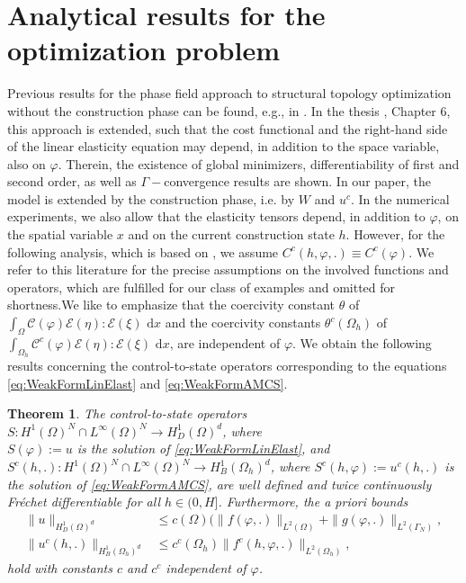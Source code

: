 \documentclass[a4paper,11pt]{article}
\newtheorem{theorem}{Theorem}%
\theoremstyle{remark}
\newcommand{\dx}{\text{ d}x}
\newcommand{\HON}{H^1(\Omega)^N }
\newcommand{\LinfN}{L^\infty(\Omega)^N}
\begin{document}
\newpage
\section{Analytical results for the optimization problem}
\label{sec:AnalysisOCP}
Previous results for the phase field approach to structural topology optimization without the construction phase can be found, e.g., in \cite{BFGS14,VMPT,BurgerStainko,Dede2012,PRW12}. 
In the thesis \cite{DissRupprecht}, Chapter 6, this approach is extended, such that the cost functional and the right-hand side of the linear elasticity equation may depend, in addition to the space variable, also on $\varphi$.
Therein, the existence of global minimizers, differentiability of first and second order, as well as $\Gamma-$convergence results are shown.
%
In our paper, the model is extended by the construction phase, i.e. by $W$ and $u^c$.
In the numerical experiments, we also allow that the elasticity tensors depend, in addition to $\varphi$, on the spatial variable $x$ and on the current construction state $h$.
However, for the following analysis, which is based on \cite{DissRupprecht}, we assume
$C^c(h,\varphi,.)\equiv C^c(\varphi)$.
We refer to this literature for the precise assumptions on the involved functions and operators, which are fulfilled for our class of examples and omitted for shortness.We like to emphasize that
the coercivity constant $\theta $
of
 $\int_{\Omega}\mathcal{C}(\varphi)
 \mathcal{E}(\eta):\mathcal{E}(\xi) \dx$
 and the  coercivity constants
 $\theta^c(\Omega_h)$
of $\int_{\Omega_{h}}\mathcal{C}^c(\varphi)
 \mathcal{E}(\eta):\mathcal{E}(\xi) \dx$,
 are independent of 
 $\varphi$.
We obtain the following results concerning the control-to-state operators corresponding to the equations \eqref{eq:WeakFormLinElast} and \eqref{eq:WeakFormAMCS}.
\begin{theorem}
The control-to-state operators
 $S:\HON \cap \LinfN \rightarrow H^1_D(\Omega)^d $,
 where \\ 
 $S(\varphi):=u$ is the solution of \eqref{eq:WeakFormLinElast},
 and
 $S^c(h,.):\HON \cap \LinfN \rightarrow  H^1_B(\Omega_{h})^d$,
 where $S^c(h,\varphi):=u^c(h,.)$ is the solution of \eqref{eq:WeakFormAMCS},
are well defined and twice continuously
Fréchet differentiable
for all $h\in (0,H]$. 
Furthermore, the a priori bounds 
\begin{align}
\label{apriori1}
  \| u \| _{ H^1_D(\Omega)^d} &\leq
                                c(\Omega) (\| f(\varphi,.)  \| _{L^2(\Omega)} + \| g(\varphi,.)  \| _{L^2(\Gamma_N)}, \\
  \label{apriori}
\| u^c(h,.) \| _{ H^1_B(\Omega_{h})^d} &\leq c^c(\Omega_h) \| f^c(h,\varphi ,.)  \| _{L^2(\Omega_h)},
\end{align}
hold with constants $c$ and $c^c$ independent of $\varphi$.
\end{theorem}
\end{document}
